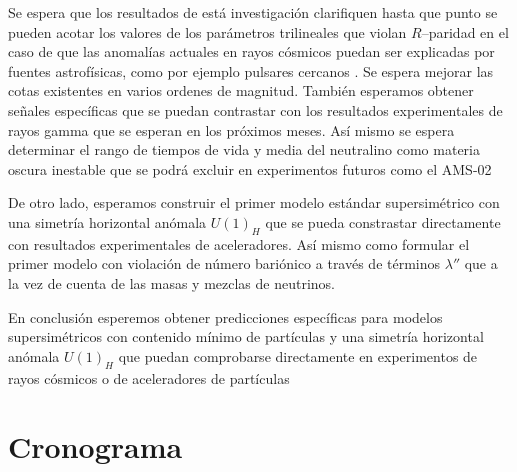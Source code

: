 \documentclass[11pt]{article}
\begin{document}
Se espera que los resultados de está investigación clarifiquen hasta que punto se pueden acotar los valores de los parámetros trilineales que violan $R$--paridad en el caso de que las anomalías actuales en rayos cósmicos puedan ser explicadas por fuentes astrofísicas, como por ejemplo pulsares cercanos \cite[y referencias internas]{Chowdhury:2009jd}. Se espera mejorar las cotas existentes \cite{Barbieri:1988mw,Berezinsky:1991sp,Diwan:1996gw,Berezinsky:1996pb,Baltz:1997ar,Gupta:2004dz,Huber:2005iz} en varios ordenes de magnitud. También esperamos obtener señales específicas que se puedan contrastar con los resultados experimentales de rayos gamma que se esperan en los próximos meses.
Así mismo se espera determinar el rango de tiempos de vida y media del neutralino como materia oscura inestable que se podrá excluir en experimentos futuros como el AMS-02 \cite{ams:2009}

De otro lado, esperamos construir el primer modelo estándar supersimétrico con una simetría horizontal anómala $U(1)_H$ que se pueda constrastar directamente con resultados experimentales de aceleradores. Así mismo como formular el primer modelo con violación de número bariónico a través de términos $\lambda''$ que a la vez de cuenta de las masas y mezclas de neutrinos.

En conclusión esperemos obtener predicciones específicas para modelos supersimétricos con contenido mínimo de partículas y una simetría horizontal anómala $U(1)_H$ que puedan comprobarse directamente en experimentos de rayos cósmicos o de aceleradores de partículas



\section{ Cronograma}
\end{document}
